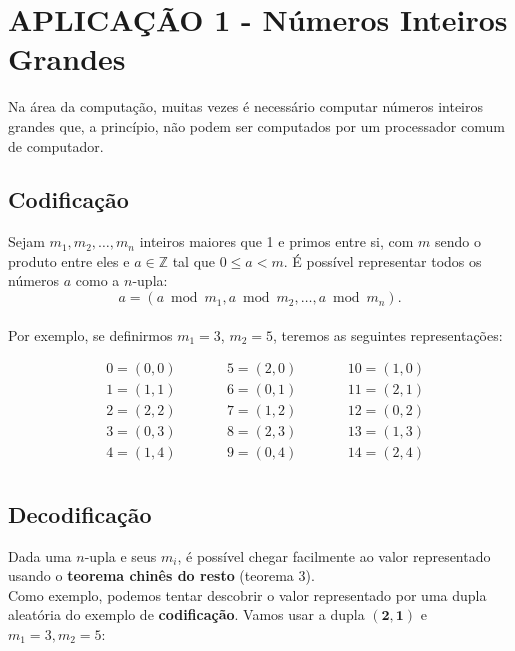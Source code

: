 \section*{APLICAÇÃO 1 - Números Inteiros Grandes}
Na área da computação, muitas vezes é necessário computar números inteiros grandes que, a princípio, não podem ser computados por um processador comum de computador.\\

\subsection*{Codificação}
Sejam $m_1, m_2, \dots, m_n$ inteiros maiores que 1 e primos entre si, com $m$ sendo o produto entre eles e  $a \in \mathbb{Z}$ tal que $0 \leq a < m$. É possível representar todos os números $a$ como a $n$-upla:
\[
    a = (a \bmod m_1, a \bmod m_2, \dots, a \bmod m_n).
\]
\\
Por exemplo, se definirmos $m_1 = 3$, $m_2 = 5$, teremos as seguintes representações:

\begin{align*}
     & 0 = (0, 0) & \qquad & 5 = (2, 0) & \qquad & 10 = (1, 0) \\
     & 1 = (1, 1) & \qquad & 6 = (0, 1) & \qquad & 11 = (2, 1) \\
     & 2 = (2, 2) & \qquad & 7 = (1, 2) & \qquad & 12 = (0, 2) \\
     & 3 = (0, 3) & \qquad & 8 = (2, 3) & \qquad & 13 = (1, 3) \\
     & 4 = (1, 4) & \qquad & 9 = (0, 4) & \qquad & 14 = (2, 4) \\
\end{align*}

\subsection*{Decodificação}
Dada uma $n$-upla e seus $m_i$, é possível chegar facilmente ao valor representado usando o \textbf{teorema chinês do resto} (teorema 3).\\

Como exemplo, podemos tentar descobrir o valor representado por uma dupla aleatória do exemplo de \textbf{codificação}. Vamos usar a dupla $\mathbf{(2,1)}$ e $m_1 = 3, m_2 = 5$:

